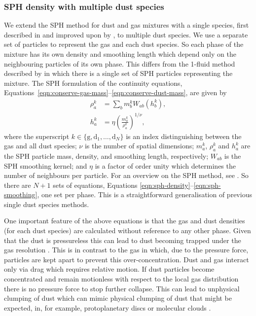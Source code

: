 \documentclass[fleqn,usenatbib]{mnras}
\newcommand{\g}{\mathrm{g}}
\newcommand{\dd}{\mathrm{d}}
\begin{document}
\subsubsection{SPH density with multiple dust species}

We extend the SPH method for dust and gas mixtures with a single species, first
described in \citet{Monaghan1995CoPhC..87..225M} and improved upon by
\citet{Laibe2012MNRAS.420.2345L,Laibe2012MNRAS.420.2365L}, to multiple dust
species. We use a separate set of particles to represent the gas and each dust
species. So each phase of the mixture has its own density and smoothing length
which depend only on the neighbouring particles of its own phase. This differs
from the 1-fluid method described by \citet{Hutchison2018MNRAS.476.2186H} in
which there is a single set of SPH particles representing the mixture. The SPH
formulation of the continuity equations,
Equations~\ref{eqn:conserve-gas-mass}--\ref{eqn:conserve-dust-mass}, are given
by
%
\begin{align}
   \label{eqn:sph-density}
   \rho^k_a &= \sum_b m^k_b W_{ab}(h^k_b), \\
   h^k_a &= \eta \left(\frac{m^k_a}{\rho^k_a}\right)^{1/\nu},
   \label{eqn:sph-smoothing}
\end{align}
%
where the superscript \(k \in \{\g, \dd_1, \dots, \dd_N\}\) is an index
distinguishing between the gas and all dust species; \(\nu\) is the number of
spatial dimensions; \(m^k_a\), \(\rho^k_a\) and \(h^k_a\) are the SPH particle
mass, density, and smoothing length, respectively; \(W_{ab}\) is the SPH
smoothing kernel; and \(\eta\) is a factor of order unity which determines the
number of neighbours per particle. For an overview on the SPH method, see
\citet{Monaghan1992ARA&A..30..543M, Monaghan2005RPPh...68.1703M,
Price2012JCoPh.231..759P}. So there are \(N + 1\) sets of equations, Equations
\ref{eqn:sph-density}--\ref{eqn:sph-smoothing}, one set per phase. This is a
straightforward generalisation of previous single dust species methods.

One important feature of the above equations is that the gas and dust densities
(for each dust species) are calculated without reference to any other phase.
Given that the dust is pressureless this can lead to dust becoming trapped under
the gas resolution \citep{Laibe2012MNRAS.420.2345L}. This is in contrast to the
gas in which, due to the pressure force, particles are kept apart to prevent
this over-concentration. Dust and gas interact only via drag which requires
relative motion. If dust particles become concentrated and remain motionless
with respect to the local gas distribution there is no pressure force to stop
further collapse. This can lead to unphysical clumping of dust which can mimic
physical clumping of dust that might be expected, in, for example,
protoplanetary discs or molecular clouds \citep{Tricco2017MNRAS.471L..52T,
Hopkins2020MNRAS.496.2123H}.
\end{document}
